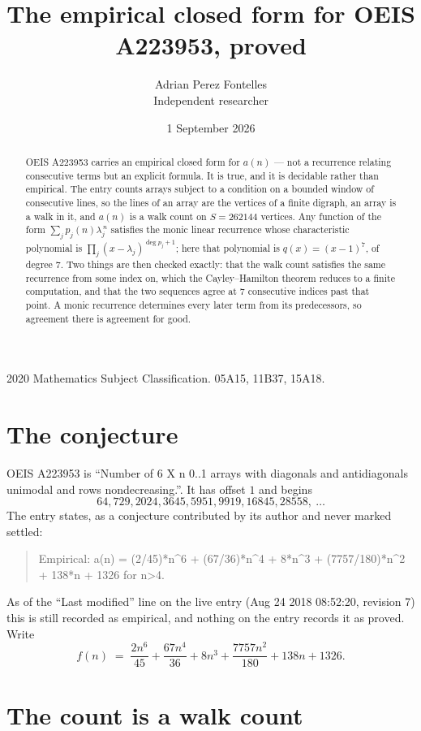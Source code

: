 \documentclass[11pt,a4paper]{article}
\title{The empirical closed form for OEIS A223953, proved}
\author{Adrian Perez Fontelles\\ \small Independent researcher}
\date{1 September 2026}
\theoremstyle{plain}
\theoremstyle{definition}
\begin{document}
\maketitle

\begin{abstract}
OEIS A223953 carries an empirical closed form for $a(n)$ --- not a recurrence relating
consecutive terms but an explicit formula. It is true, and it is decidable rather than
empirical. The entry counts arrays subject to a condition on a bounded window of consecutive lines, so the lines of an array are the
vertices of a finite digraph, an array is a walk in it, and $a(n)$ is a walk count on
$S=262144$ vertices. Any function of the form $\sum_j p_j(n)\lambda_j^{\,n}$ satisfies the
monic linear recurrence whose characteristic polynomial is
$\prod_j(x-\lambda_j)^{\deg p_j+1}$; here that polynomial is $q(x)=(x-1)^{7}$, of degree
$7$. Two things are then checked exactly: that the walk count satisfies the same
recurrence from some index on, which the Cayley--Hamilton theorem reduces to a finite
computation, and that the two sequences agree at $7$ consecutive indices past that
point. A monic recurrence determines every later term from its predecessors, so agreement
there is agreement for good.
\end{abstract}

\noindent\small 2020 Mathematics Subject Classification. 05A15, 11B37, 15A18.\normalsize

\section{The conjecture}

OEIS A223953 is ``Number of 6 X n 0..1 arrays with diagonals and antidiagonals unimodal and rows nondecreasing.''. It has offset $1$ and begins
\[
64, 729, 2024, 3645, 5951, 9919, 16845, 28558,\ \dots
\]
The entry states, as a conjecture contributed by its author and never marked settled:
\begin{quote}
Empirical: a(n) = (2/45)*n\^{}6 + (67/36)*n\^{}4 + 8*n\^{}3 + (7757/180)*n\^{}2 + 138*n + 1326 for n>4.
\end{quote}
As of the ``Last modified'' line on the live entry (Aug 24 2018 08:52:20, revision 7) this is still
recorded as empirical, and nothing on the entry records it as proved. Write
\[
f(n)\;=\;\frac{2 n^{6}}{45} + \frac{67 n^{4}}{36} + 8 n^{3} + \frac{7757 n^{2}}{180} + 138 n + 1326.
\]

\section{The count is a walk count}
\end{document}
